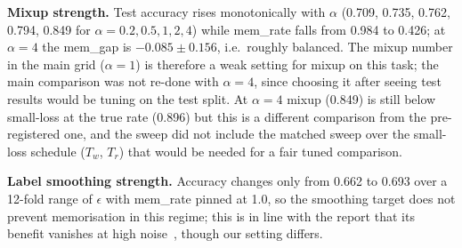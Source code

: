 \textbf{Mixup strength.} Test accuracy rises monotonically with $\alpha$ (0.709, 0.735, 0.762, 0.794, 0.849 for $\alpha=0.2,0.5,1,2,4$) while mem\_rate falls from 0.984 to 0.426; at $\alpha=4$ the mem\_gap is $-0.085\pm0.156$, i.e.\ roughly balanced. The mixup number in the main grid ($\alpha{=}1$) is therefore a weak setting for mixup on this task; the main comparison was not re-done with $\alpha{=}4$, since choosing it after seeing test results would be tuning on the test split. At $\alpha{=}4$ mixup (0.849) is still below small-loss at the true rate (0.896) but this is a different comparison from the pre-registered one, and the sweep did not include the matched sweep over the small-loss schedule ($T_w$, $T_r$) that would be needed for a fair tuned comparison.

\textbf{Label smoothing strength.} Accuracy changes only from 0.662 to 0.693 over a 12-fold range of $\epsilon$ with mem\_rate pinned at 1.0, so the smoothing target does not prevent memorisation in this regime; this is in line with the report that its benefit vanishes at high noise~\cite{wei2021smooth}, though our setting differs.
